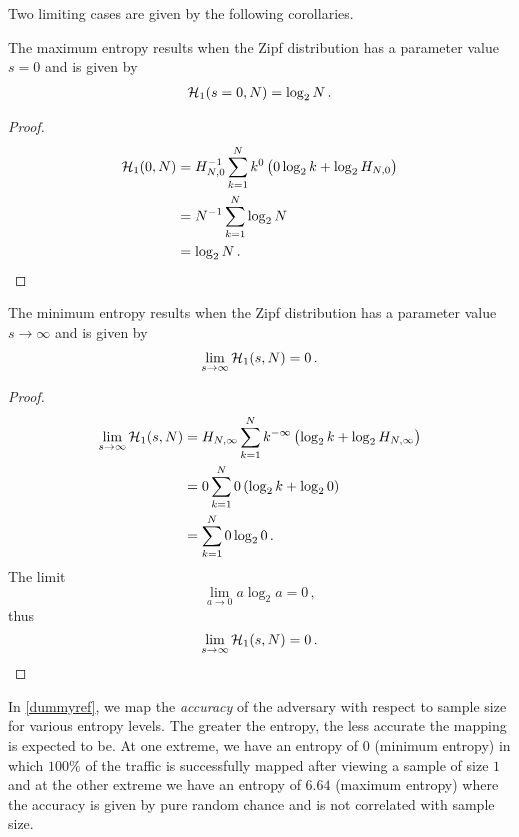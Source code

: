 \documentclass[ ../main.tex]{subfiles}
\newcommand{\harmonic}[2]{H_{#1,#2}}
\begin{document}
Two limiting cases are given by the following corollaries.
\begin{corollary}
The maximum entropy results when the Zipf distribution has a parameter value $s=0$ and is given by
\begin{align}
    \operatorname{\mathcal{H}}_1(s = 0,N) = \log_2 N\,.
\end{align}
\end{corollary}
\begin{proof}
\begin{align}
    \entropy_1(0,N)
        &= \harmonic{N}{0}^{-1} \sum_{k=1}^{N} k^{0}
        \left(0 \log_2 k + \log_2 \harmonic{N}{0}\right)\\
        &= N^{-1} \sum_{k=1}^{N} \log_2 N\\
        &= \log_2 N\,.
\end{align}
\end{proof}

\begin{corollary}
The minimum entropy results when the Zipf distribution has a parameter value $s \to \infty$ and is given by
\begin{align}
    \lim_{s \to \infty} \operatorname{\mathcal{H}}_1(s,N) = 0\,.
\end{align}
\end{corollary}
\begin{proof}
\begin{align}
    \lim_{s \to \infty} \entropy_1(s,N)
        &= \harmonic{N}{\infty} \sum_{k=1}^{N} k^{-\infty}
        \left(\log_2 k + \log_2 \harmonic{N}{\infty}\right)\\
        &= 0 \sum_{k=1}^{N} 0
        \left(\log_2 k + \log_2 0\right)\\
        &= \sum_{k=1}^{N} 0 \log_2 0\,.
\end{align}
The limit
\begin{equation}
    \lim_{a \to 0} a \log_2 a = 0\,,
\end{equation}
thus
\begin{equation}
    \lim_{s \to \infty} \operatorname{\mathcal{H}}_1(s,N) = 0\,.
\end{equation}
\end{proof}

In \cref{dummyref}, we map the \emph{accuracy} of the adversary with respect to sample size for various entropy levels. The greater the entropy, the less accurate the mapping is expected to be. At one extreme, we have an entropy of $0$ (minimum entropy) in which $100\%$ of the traffic is successfully mapped after viewing a sample of size $1$ and at the other extreme we have an entropy of $6.64$ (maximum entropy) where the accuracy is given by pure random chance and is not correlated with sample size.
\end{document}
